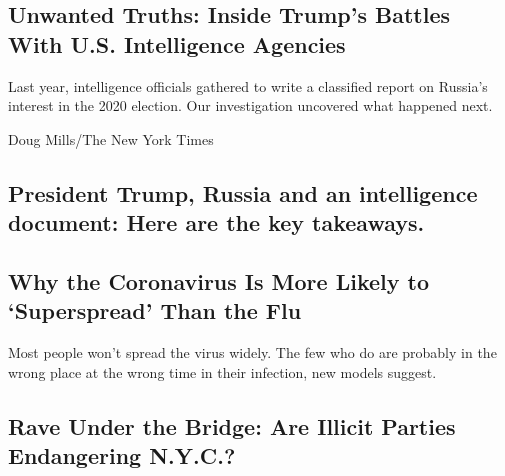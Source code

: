 \hypertarget{unwanted-truths-inside-trumps-battles-with-us-intelligence-agencies}{%
\subsection{Unwanted Truths: Inside Trump's Battles With U.S.
Intelligence
Agencies}\label{unwanted-truths-inside-trumps-battles-with-us-intelligence-agencies}}

Last year, intelligence officials gathered to write a classified report
on Russia's interest in the 2020 election. Our investigation uncovered
what happened next.

\href{/2020/08/08/magazine/us-russia-intelligence.html}{}

Doug Mills/The New York Times

\href{/2020/08/08/us/politics/trump-russia.html}{}

\hypertarget{president-trump-russia-and-an-intelligence-document-here-are-the-key-takeaways}{%
\subsection{President Trump, Russia and an intelligence document: Here
are the key
takeaways.}\label{president-trump-russia-and-an-intelligence-document-here-are-the-key-takeaways}}

\href{/2020/08/07/health/coronavirus-superspreading-contagion.html}{}

\hypertarget{why-the-coronavirus-is-more-likely-to-superspread-than-the-flu}{%
\subsection{Why the Coronavirus Is More Likely to `Superspread' Than the
Flu}\label{why-the-coronavirus-is-more-likely-to-superspread-than-the-flu}}

Most people won't spread the virus widely. The few who do are probably
in the wrong place at the wrong time in their infection, new models
suggest.

\href{/2020/08/08/nyregion/nyc-illegal-parties.html}{}

\hypertarget{rave-under-the-bridge-are-illicit-parties-endangering-nyc}{%
\subsection{Rave Under the Bridge: Are Illicit Parties Endangering
N.Y.C.?}\label{rave-under-the-bridge-are-illicit-parties-endangering-nyc}}

